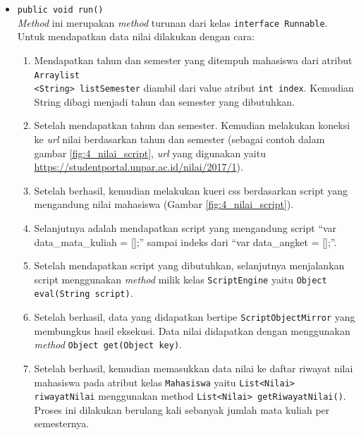 \begin{enumerate}
\begin{itemize}
		\item \texttt{public void run()}\\
    	 \textit{Method} ini merupakan \textit{method} turunan dari kelas \texttt{interface Runnable}. Untuk mendapatkan data nilai dilakukan dengan cara:
    	\begin{enumerate}
    		\item Mendapatkan tahun dan semester yang ditempuh mahasiswa dari atribut \texttt{Arraylist\\<String> listSemester} diambil dari value atribut \texttt{int index}. Kemudian String dibagi menjadi tahun dan semester yang dibutuhkan.
    		\item Setelah mendapatkan tahun dan semester. Kemudian melakukan koneksi ke \textit{url} nilai berdasarkan tahun dan semester (sebagai contoh dalam gambar \ref{fig:4_nilai_script}, \textit{url} yang digunakan yaitu \url{https://studentportal.unpar.ac.id/nilai/2017/1}).
    		\item Setelah berhasil, kemudian melakukan kueri css berdasarkan script yang mengandung nilai mahasiswa (Gambar \ref{fig:4_nilai_script}). 
    		\item Selanjutnya adalah mendapatkan script yang mengandung script ``var data\_mata\_kuliah = [];'' sampai indeks dari ``var data\_angket = [];''.
    		\item Setelah mendapatkan script yang dibutuhkan, selanjutnya menjalankan script menggunakan \textit{method} milik kelas \texttt{ScriptEngine} yaitu \texttt{Object eval(String script)}.
    		\item Setelah berhasil, data yang didapatkan bertipe \texttt{ScriptObjectMirror} yang membungkus hasil eksekusi. Data nilai didapatkan dengan menggunakan \textit{method} \texttt{Object get(Object key)}.
    		\item Setelah berhasil, kemudian memasukkan data nilai ke daftar riwayat nilai mahasiswa pada atribut kelas \texttt{Mahasiswa} yaitu \texttt{List<Nilai> riwayatNilai} menggunakan method \texttt{List<Nilai> getRiwayatNilai()}. Proses ini dilakukan berulang kali sebanyak jumlah mata kuliah per semesternya.
    	\end{enumerate}
    	

\end{itemize}
\end{enumerate}
